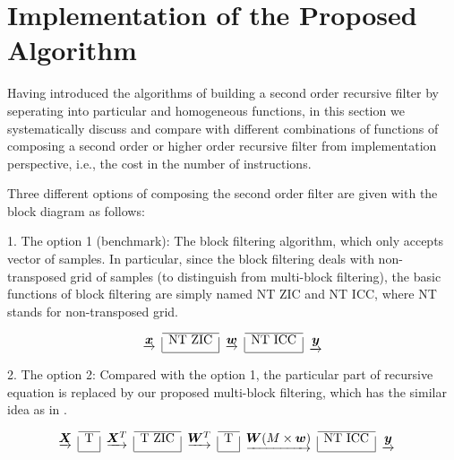 \section{Implementation of the Proposed Algorithm}
\label{sec:implementation}

Having introduced the algorithms of building a second order recursive filter by seperating into 
particular and homogeneous functions,
in this section we systematically discuss and compare with 
different combinations of functions of composing a second order or higher order recursive filter from implementation 
perspective, i.e., the cost in the number of instructions. 

Three different options of composing the second order filter are given with the block diagram as follows:

1. The option 1 (benchmark): The block filtering algorithm, which only accepts vector of samples. In particular, since the block filtering
deals with non-transposed grid of samples (to distinguish from multi-block filtering), the basic functions of block filtering
are simply named NT ZIC and NT ICC, where NT stands for non-transposed grid.

\begin{equation*}
    \label{eq:option_1}
        \begin{array}{c|c|c|c|c}
            \cline{2-2}
            \cline{4-4}
            \underrightarrow{\bm{x}} & \text{NT ZIC} & \underrightarrow{\bm{w}} & \text{NT ICC} & \underrightarrow{\bm{y}} \\
            \cline{2-2}
            \cline{4-4}
    \end{array}
\end{equation*}

2. The option 2: Compared with the option 1, the particular part of recursive equation is replaced by our proposed multi-block filtering,
which has the similar idea as in \cite{Jaewoo_09}.

\begin{equation*}
    \label{eq:option_2}
    \begin{aligned}
        & \begin{array}{c|c|c|c|c|c|c|c|c}
            \cline{2-2}
            \cline{4-4}
            \cline{6-6}
            \cline{8-8}
            \underrightarrow{\bm{X}} & \text{T} & \underrightarrow{\bm{X}^T} & \text{T ZIC} & \underrightarrow{\bm{W}^T} & \text{T} & \underrightarrow{\bm{W} (M \times \bm{w})} & \text{NT ICC} & \underrightarrow{\bm{y}} \\
            \cline{2-2}
            \cline{4-4}
            \cline{6-6}
            \cline{8-8}
    \end{array}
\end{aligned}
\end{equation*}

